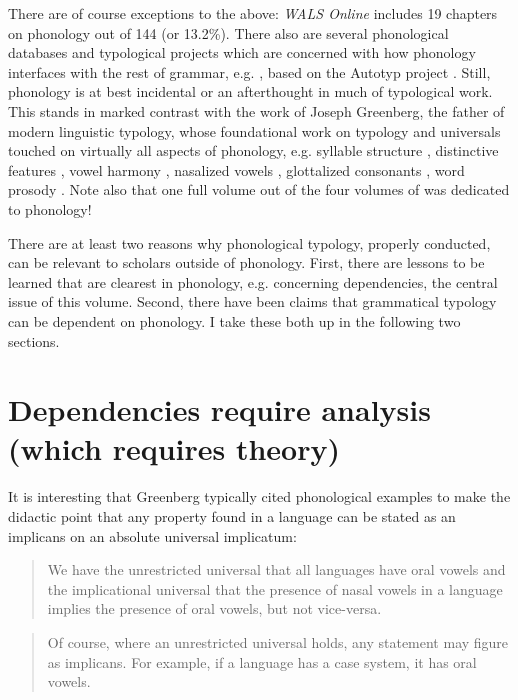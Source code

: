 \documentclass[output=paper]{langsci/langscibook}
\begin{document}
  There are of course exceptions to the above: \textit{WALS Online} \citep{DryerEtAl2013} includes 19 chapters on phonology out of 144 (or 13.2\%). There also are several phonological databases and typological projects which are concerned with how phonology interfaces with the rest of grammar, e.g. \citet{BickelEtAl2009}, based on the Autotyp project \citep{BickelEtAl2016}. Still, phonology is at best incidental or an afterthought in much of typological work. This stands in marked contrast with the work of Joseph Greenberg, the father of modern linguistic typology, whose foundational work on typology and universals touched on virtually all aspects of phonology, e.g. syllable structure \citep{Greenberg1962,Greenberg1978a}, distinctive features \citep{Greenberg1967}, vowel harmony \citep{Greenberg1963}, nasalized vowels  \citep{Greenberg1966phonology,Greenberg1978b}, glottalized consonants \citep{Greenberg1970}, word prosody \citep{Greenberg1976}. Note also that one full volume out of the four volumes of \citet{Greenberg1978Universals} was dedicated to phonology!

  There are at least two reasons why phonological typology, properly conducted, can be relevant to scholars outside of phonology. First, there are lessons to be learned that are clearest in phonology, e.g. concerning dependencies, the central  issue of this volume. Second, there have been claims that grammatical typology can be dependent on phonology. I take these both up in the following two sections.

\section{Dependencies require analysis (which requires theory)}

It is interesting that Greenberg typically cited phonological examples to make the didactic point that any property found in a language can be stated as an implicans on an absolute universal implicatum:
   
\begin{quote}
We have the unrestricted universal that all languages have oral vowels and the implicational universal that the presence of nasal vowels in a language implies the presence of oral vowels, but not vice-versa. \citep[509]{Greenberg1966phonology}
\end{quote}

\begin{quote}
Of course, where an unrestricted universal holds, any statement may figure as implicans. For example, if a language has a case system, it has oral vowels. \citep[509]{Greenberg1966phonology}
\end{quote}
\end{document}

